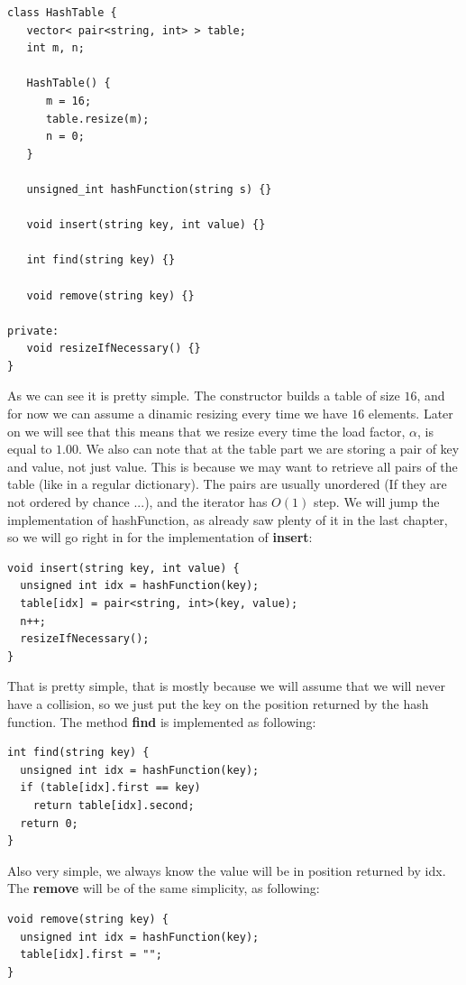 \begin{lstlisting}
class HashTable {
   vector< pair<string, int> > table;
   int m, n;
   
   HashTable() {
      m = 16;
      table.resize(m);
      n = 0;
   }

   unsigned_int hashFunction(string s) {}
   
   void insert(string key, int value) {}

   int find(string key) {}

   void remove(string key) {}

private:
   void resizeIfNecessary() {}
}
\end{lstlisting}

As we can see it is pretty simple. The constructor builds a table of size \( 16 \), and for now we can assume a dinamic resizing every time we have \( 16 \) elements. Later on we will see that this means that we resize every time the load factor, \( \alpha \), is equal to \( 1.00 \). We also can note that at the table part we are storing a pair of key and value, not just value. This is because we may want to retrieve all pairs of the table (like in a regular dictionary). The pairs are usually unordered (If they are not ordered by chance ...), and the iterator has \( O(1) \) step. We will jump the implementation of hashFunction, as already saw plenty of it in the last chapter, so we will go right in for the implementation of \textbf{insert}:

\begin{lstlisting}
void insert(string key, int value) {
  unsigned int idx = hashFunction(key);
  table[idx] = pair<string, int>(key, value);
  n++;
  resizeIfNecessary();
}
\end{lstlisting}

That is pretty simple, that is mostly because we will assume that we will never have a collision, so we just put the key on the position returned by the hash function. The method \textbf{find} is implemented as following:

\begin{lstlisting}
int find(string key) {
  unsigned int idx = hashFunction(key);
  if (table[idx].first == key)
    return table[idx].second;
  return 0;
}
\end{lstlisting}

Also very simple, we always know the value will be in position returned by idx. The \textbf{remove} will be of the same simplicity, as following:

\begin{lstlisting}
void remove(string key) {
  unsigned int idx = hashFunction(key);
  table[idx].first = "";
}
\end{lstlisting}

